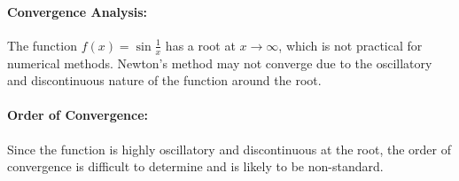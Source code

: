 \documentclass[11pt,onecolumn]{article}
\begin{document}
\begin{enumerate}[label=(\alph*)]
\paragraph{Convergence Analysis:}
The function \( f(x) = \sin{\frac{1}{x}} \) has a root at \( x \to \infty \), which is not practical for numerical methods. Newton's method may not converge due to the oscillatory and discontinuous nature of the function around the root.

\paragraph{Order of Convergence:}
Since the function is highly oscillatory and discontinuous at the root, the order of convergence is difficult to determine and is likely to be non-standard.


\end{enumerate}
\end{document}
